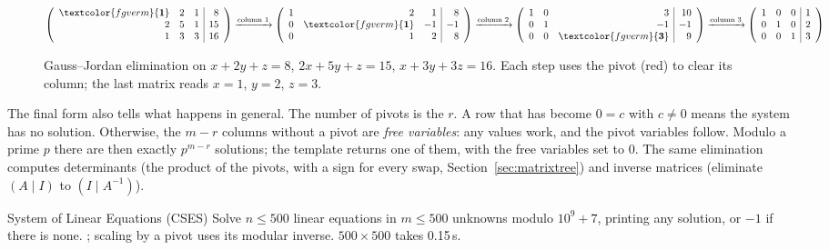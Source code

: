 \begin{figure}[htbp]
\centering
\newcommand{\gpiv}[1]{\textcolor{fgverm}{\mathbf{#1}}}
$\left(\begin{array}{rrr|r} \gpiv{1} & 2 & 1 & 8 \\ 2 & 5 & 1 & 15 \\ 1 & 3 & 3 & 16 \end{array}\right)
\xrightarrow{\text{column 1}}
\left(\begin{array}{rrr|r} 1 & 2 & 1 & 8 \\ 0 & \gpiv{1} & -1 & -1 \\ 0 & 1 & 2 & 8 \end{array}\right)
\xrightarrow{\text{column 2}}
\left(\begin{array}{rrr|r} 1 & 0 & 3 & 10 \\ 0 & 1 & -1 & -1 \\ 0 & 0 & \gpiv{3} & 9 \end{array}\right)
\xrightarrow{\text{column 3}}
\left(\begin{array}{rrr|r} 1 & 0 & 0 & 1 \\ 0 & 1 & 0 & 2 \\ 0 & 0 & 1 & 3 \end{array}\right)$
\caption{Gauss--Jordan elimination on $x + 2y + z = 8$, $2x + 5y + z = 15$, $x + 3y + 3z = 16$. Each step uses the pivot (red) to clear
its column; the last matrix reads $x = 1$, $y = 2$, $z = 3$.}
\label{fig:gauss}
\end{figure}

The final form also tells what happens in general. The number of pivots is the  $r$. A row that has become $0 = c$ with
$c \ne 0$ means the system has no solution. Otherwise, the $m - r$ columns without a pivot are \emph{free variables}: any values work,
and the pivot variables follow. Modulo a prime $p$ there are then exactly $p^{m-r}$ solutions; the template returns one of them, with the
free variables set to 0. The same elimination computes determinants (the product of the pivots, with a sign for every swap,
Section~\ref{sec:matrixtree}) and inverse matrices (eliminate $(A \mid I)$ to $(I \mid A^{-1})$).


\begin{problem}{System of Linear Equations (CSES)}
Solve $n \le 500$ linear equations in $m \le 500$ unknowns modulo $10^9 + 7$, printing any solution, or $-1$ if there is none.
\solution {}; scaling by a pivot uses its modular inverse. $500 \times 500$ takes 0.15\,s.
\end{problem}

